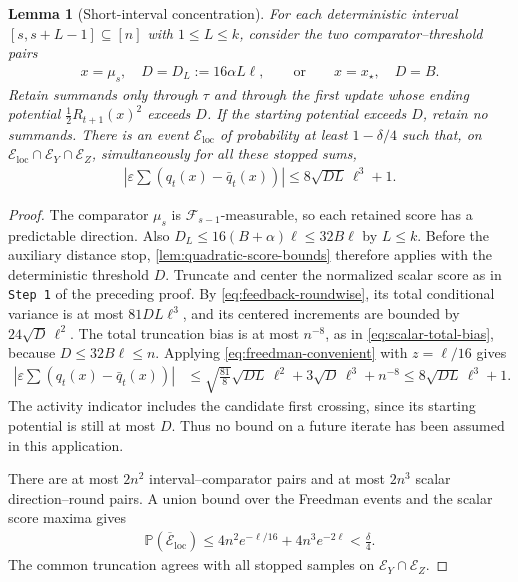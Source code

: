 \documentclass{article}
\newtheorem{lemma}[lemma]{Lemma}
\newcommand{\Pp}{\mathbb P}
\newcommand{\F}{\mathcal F}
\newcommand{\1}{\mathbf 1}
\newcommand{\eps}{\varepsilon}
\begin{document}
\begin{lemma}[Short-interval concentration]
    \label{lem:local-concentration}
    For each deterministic interval $[s,s+L-1]\subseteq[n]$ with
    $1\leq L\leq k$, consider the two comparator--threshold pairs
    \begin{align}
        x=\mu_s,\quad D=D_L:=16\alpha L\ell,
        \qquad\text{or}\qquad
        x=x_\star,\quad D=B.
        \label{eq:local-threshold}
    \end{align}
    Retain summands only through $\tau$ and through the first update
    whose ending potential $\frac12R_{t+1}(x)^2$ exceeds $D$. If the starting
    potential exceeds $D$, retain no summands. There is an event
    $\mathcal E_{\mathrm{loc}}$ of probability at least $1-\delta/4$
    such that, on $\mathcal E_{\mathrm{loc}}\cap\mathcal E_Y\cap\mathcal E_Z$,
    simultaneously for all these stopped sums,
    \begin{align}
        \left|\eps\sum
        \left(q_t(x)-\bar{q}_t(x)\right)\right|
        \leq8\sqrt{DL}\,\ell^3+1.
        \label{eq:local-q-concentration}
    \end{align}
\end{lemma}
\begin{proof}
    The comparator $\mu_s$ is $\F_{s-1}$-measurable, so each retained
    score has a predictable direction. Also
    $D_L\leq16(B+\alpha)\ell\leq32B\ell$ by $L\leq k$.
    Before the auxiliary distance stop, \cref{lem:quadratic-score-bounds}
    therefore applies with the deterministic threshold $D$.
    Truncate and center the normalized scalar score as in
    \texttt{Step 1} of the preceding proof. By
    \eqref{eq:feedback-roundwise}, its total conditional variance is
    at most $81DL\ell^3$, and its centered increments are bounded by
    $24\sqrt D\,\ell^2$. The total truncation bias is at most $n^{-8}$,
    as in \eqref{eq:scalar-total-bias}, because $D\leq32B\ell\leq n$.
    Applying \eqref{eq:freedman-convenient} with $z=\ell/16$ gives
    \begin{align}
        \left|\eps\sum(q_t(x)-\bar{q}_t(x))\right|
         & \leq\sqrt{\frac{81}{8}}\sqrt{DL}\,\ell^2
        +3\sqrt D\,\ell^3+n^{-8}
        \leq8\sqrt{DL}\,\ell^3+1.
    \end{align}
    The activity indicator includes the candidate first crossing,
    since its starting potential is still at most $D$.
    Thus no bound on a future iterate has been assumed in this application.

    There are at most $2n^2$ interval--comparator pairs and at most
    $2n^3$ scalar direction--round pairs. A union bound over the
    Freedman events and the scalar score maxima gives
    \begin{align}
        \Pp(\overline{\mathcal E}_{\mathrm{loc}})
        \leq4n^2e^{-\ell/16}+4n^3e^{-2\ell}
        <\frac\delta4.
    \end{align}
    The common truncation agrees with all stopped samples on
    $\mathcal E_Y\cap\mathcal E_Z$.
\end{proof}
\end{document}
